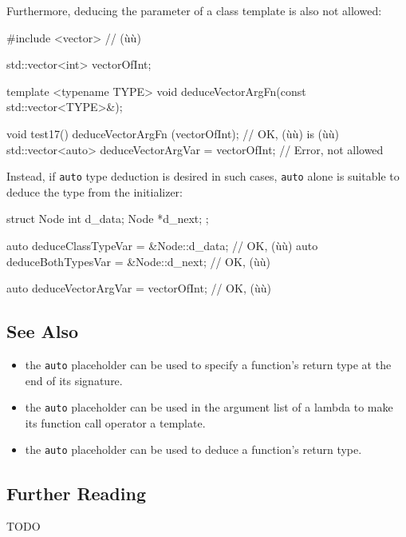 \noindent Furthermore, deducing the parameter of a class template is also not
allowed:

\begin{emcppshiddenlisting}[emcppsbatch=e22]
#include <vector>     // (ù{}ù)
\end{emcppshiddenlisting}
\begin{emcppslisting}[emcppsbatch=e22]
std::vector<int> vectorOfInt;

template <typename TYPE>
void deduceVectorArgFn(const std::vector<TYPE>&);

void test17()
{
                      deduceVectorArgFn   (vectorOfInt); // OK, (ù{}ù) is (ù{}ù)
    std::vector<auto> deduceVectorArgVar = vectorOfInt;  // Error, not allowed
}
\end{emcppslisting}
    
\noindent Instead, if \lstinline!auto! type deduction is desired in such cases,
\lstinline!auto! alone is suitable to deduce the type from the initializer:

\begin{emcppshiddenlisting}[emcppsbatch=e22]
struct Node {
int d_data;
Node *d_next;
};
\end{emcppshiddenlisting}
\begin{emcppslisting}[emcppsbatch=e22]
auto deduceClassTypeVar = &Node::d_data;  // OK, (ù{}ù)
auto deduceBothTypesVar = &Node::d_next;  // OK, (ù{}ù)

auto deduceVectorArgVar = vectorOfInt;    // OK, (ù{}ù)
\end{emcppslisting}
    

\subsection[See Also]{See Also}\label{see-also}
\begin{itemize}
\item{the \lstinline!auto! placeholder can be used to specify a function’s return type at the end of its signature.}
\item{the \lstinline!auto! placeholder can be used in the argument list of a lambda to make its function call operator a template.}
\item{the \lstinline!auto! placeholder can be used to deduce a function’s return type.}

\end{itemize}

\subsection[Further Reading]{Further Reading}

TODO
 
 
